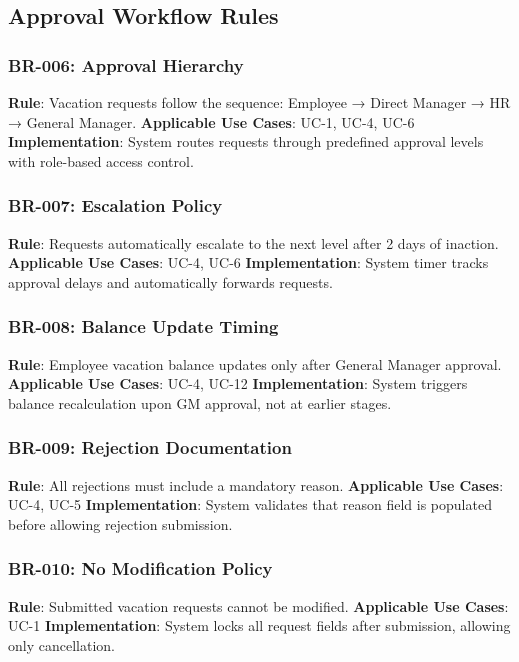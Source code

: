 \documentclass[12pt,a4paper]{article}
\begin{document}
\subsection{Approval Workflow Rules}

\subsubsection{BR-006: Approval Hierarchy}
\textbf{Rule}: Vacation requests follow the sequence: Employee → Direct Manager → HR → General Manager.
\textbf{Applicable Use Cases}: UC-1, UC-4, UC-6
\textbf{Implementation}: System routes requests through predefined approval levels with role-based access control.

\subsubsection{BR-007: Escalation Policy}
\textbf{Rule}: Requests automatically escalate to the next level after 2 days of inaction.
\textbf{Applicable Use Cases}: UC-4, UC-6
\textbf{Implementation}: System timer tracks approval delays and automatically forwards requests.

\subsubsection{BR-008: Balance Update Timing}
\textbf{Rule}: Employee vacation balance updates only after General Manager approval.
\textbf{Applicable Use Cases}: UC-4, UC-12
\textbf{Implementation}: System triggers balance recalculation upon GM approval, not at earlier stages.

\subsubsection{BR-009: Rejection Documentation}
\textbf{Rule}: All rejections must include a mandatory reason.
\textbf{Applicable Use Cases}: UC-4, UC-5
\textbf{Implementation}: System validates that reason field is populated before allowing rejection submission.

\subsubsection{BR-010: No Modification Policy}
\textbf{Rule}: Submitted vacation requests cannot be modified.
\textbf{Applicable Use Cases}: UC-1
\textbf{Implementation}: System locks all request fields after submission, allowing only cancellation.
\end{document}
